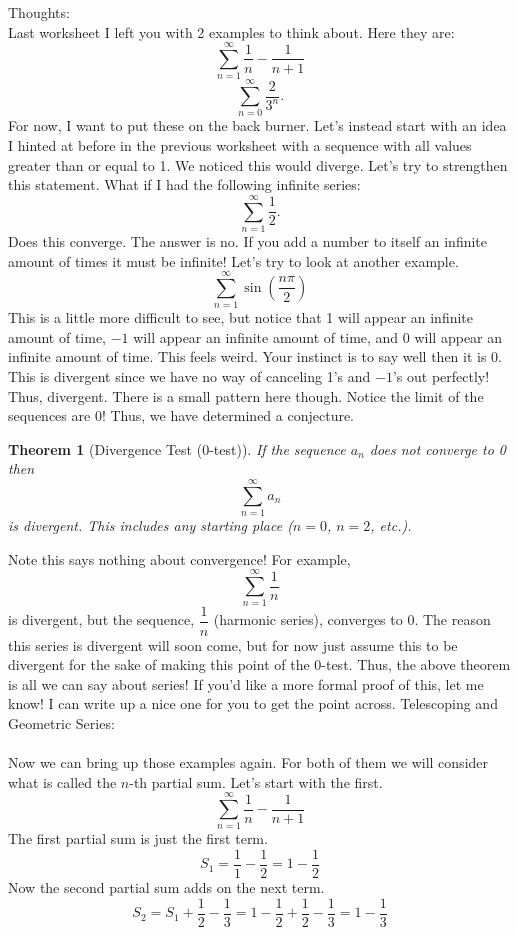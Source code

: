 \documentclass[10pt]{article}
\theoremstyle{Theorem}
\newtheorem{theorem}{Theorem}[section]
\theoremstyle{definition}
\theoremstyle{remark}
\theoremstyle{custom}
\begin{document}
\thispagestyle{firststyle}
\pagestyle{plain}


\noindent Thoughts: \\
Last worksheet I left you with 2 examples to think about. Here they are:
\[
\sum_{n=1}^{\infty}\dfrac{1}{n}-\dfrac{1}{n+1}
\]
\[
\sum_{n=0}^{\infty}\dfrac{2}{3^n}.
\]
For now, I want to put these on the back burner.  Let's instead start with an idea I hinted at before in the previous worksheet with a sequence with all values greater than or equal to 1.  We noticed this would diverge. Let's try to strengthen this statement. What if I had the following infinite series:
\[
\sum_{n=1}^{\infty}\dfrac{1}{2}.
\]
Does this converge. The answer is no. If you add a number to itself an infinite amount of times it must be infinite! Let's try to look at another example.
\[
\sum_{n=1}^{\infty}\sin\left(\dfrac{n\pi}{2}\right)
\]
This is a little more difficult to see, but notice that 1 will appear an infinite amount of time, $-1$ will appear an infinite amount of time, and 0 will appear an infinite amount of time. This feels weird. Your instinct is to say well then it is 0. This is divergent since we have no way of canceling 1's and $-1$'s out perfectly! Thus, divergent. There is a small pattern here though. Notice the limit of the sequences are 0! Thus, we have determined a conjecture.
\begin{theorem}[Divergence Test (0-test)]
If the sequence $a_n$ does not converge to 0 then 
\[
\sum_{n=1}^{\infty}a_n
\]
is divergent. This includes any starting place ($n=0$, $n=2$, etc.).  
\end{theorem}
Note this says nothing about convergence! For example,
\[
\sum_{n=1}^{\infty}\dfrac{1}{n}
\]
is divergent, but the sequence, $\dfrac{1}{n}$ (harmonic series), converges to 0. The reason this series is divergent will soon come, but for now just assume this to be divergent for the sake of making this point of the 0-test. Thus, the above theorem is all we can say about series! If you'd like a more formal proof of this, let me know! I can write up a nice one for you to get the point across.
\newpage
Telescoping and Geometric Series:\\\\
Now we can bring up those examples again. For both of them we will consider what is called the $n$-th partial sum. Let's start with the first. 
\[
\sum_{n=1}^{\infty}\dfrac{1}{n}-\dfrac{1}{n+1}
\]
The first partial sum is just the first term.
\[
S_1=\dfrac{1}{1}-\dfrac{1}{2}=1-\dfrac{1}{2}
\]
Now the second partial sum adds on the next term.
\[
S_2=S_1+\dfrac{1}{2}-\dfrac{1}{3}=1-\dfrac{1}{2}+\dfrac{1}{2}-\dfrac{1}{3}=1-\dfrac{1}{3}
\]
\end{document}

